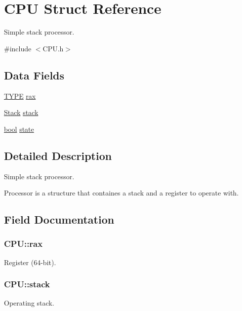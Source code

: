\hypertarget{structCPU}{}\section{C\+P\+U Struct Reference}
\label{structCPU}


Simple stack processor.  




{\ttfamily \#include $<$C\+P\+U.\+h$>$}

\subsection*{Data Fields}
\begin{DoxyCompactItemize}
\item 
\hyperlink{stack_8h_a5a392548f2df67370cb15d2a5d75cd7b}{T\+Y\+P\+E} \hyperlink{structCPU_aceb11c032a344e7e25cc2ae04332ea27}{rax}
\item 
\hyperlink{structStack}{Stack} \hyperlink{structCPU_a74f8c02df2c171f22078a7fef834058b}{stack}
\item 
\hyperlink{mylib_8h_abb452686968e48b67397da5f97445f5b}{bool} \hyperlink{structCPU_a1e09d96a128cb75989259ab544a68cc8}{state}
\end{DoxyCompactItemize}


\subsection{Detailed Description}
Simple stack processor. 

Processor is a structure that containes a stack and a register to operate with. 

\subsection{Field Documentation}
\hypertarget{structCPU_aceb11c032a344e7e25cc2ae04332ea27}{}
\subsubsection[{rax}]{ C\+P\+U\+::rax}\label{structCPU_aceb11c032a344e7e25cc2ae04332ea27}
Register (64-\/bit). \hypertarget{structCPU_a74f8c02df2c171f22078a7fef834058b}{}
\subsubsection[{stack}]{ C\+P\+U\+::stack}\label{structCPU_a74f8c02df2c171f22078a7fef834058b}
Operating stack. \hypertarget{structCPU_a1e09d96a128cb75989259ab544a68cc8}{}
